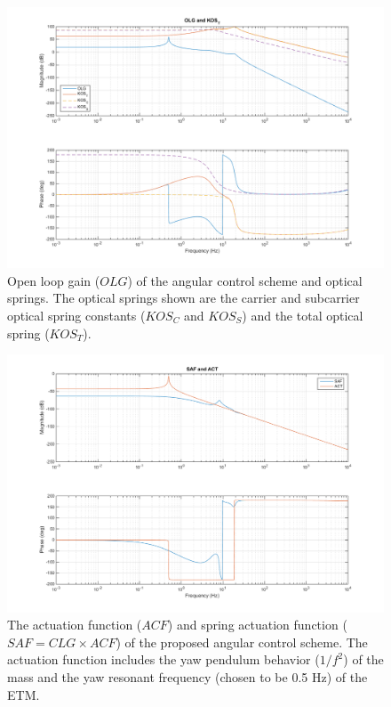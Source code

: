 \begin{figure}[htp]%
\begin{center}
\includegraphics[width=\textwidth]{figures/application/OLG}%
\caption[4 km angular open loop gain]{Open loop gain ($OLG$) of the angular control scheme and optical springs. The optical springs shown are the carrier and subcarrier optical spring constants ($KOS_C$ and $KOS_S$) and the total optical spring ($KOS_T$).}%
\label{fig:longtrapfoldedOLG}%
\end{center}
\end{figure}

\begin{figure}[htp]%
\begin{center}
\includegraphics[width=\textwidth]{figures/application/SAF}%
\caption[4 km angular closed loop gain]{The actuation function ($ACF$) and spring actuation function ($SAF = CLG\times ACF$) of the proposed angular control scheme. The actuation function includes the yaw pendulum behavior ($1/f^2$) of the mass and the yaw resonant frequency (chosen to be 0.5 Hz) of the ETM. }%
\label{fig:longtrapfoldedSAF}%
\end{center}
\end{figure}



%

%
